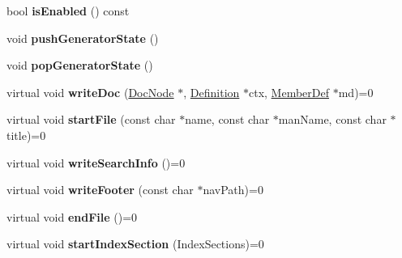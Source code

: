 \begin{DoxyCompactItemize}
\item 
\hypertarget{class_output_generator_ae2931e09e0fd8eac15c83f0254b4e4ac}{bool {\bfseries is\-Enabled} () const }\label{class_output_generator_ae2931e09e0fd8eac15c83f0254b4e4ac}

\item 
\hypertarget{class_output_generator_aff968dbb6182903ac3a2c899cf1078f3}{void {\bfseries push\-Generator\-State} ()}\label{class_output_generator_aff968dbb6182903ac3a2c899cf1078f3}

\item 
\hypertarget{class_output_generator_a9fd3c9d8d193a665b4b1c233ae573753}{void {\bfseries pop\-Generator\-State} ()}\label{class_output_generator_a9fd3c9d8d193a665b4b1c233ae573753}

\item 
\hypertarget{class_output_generator_afc7cddcd264f5a03354e49ef05784e83}{virtual void {\bfseries write\-Doc} (\hyperlink{class_doc_node}{Doc\-Node} $\ast$, \hyperlink{class_definition}{Definition} $\ast$ctx, \hyperlink{class_member_def}{Member\-Def} $\ast$md)=0}\label{class_output_generator_afc7cddcd264f5a03354e49ef05784e83}

\item 
\hypertarget{class_output_generator_ad3b720cb3c3605739030faabe156e3ff}{virtual void {\bfseries start\-File} (const char $\ast$name, const char $\ast$man\-Name, const char $\ast$title)=0}\label{class_output_generator_ad3b720cb3c3605739030faabe156e3ff}

\item 
\hypertarget{class_output_generator_aafe95bf864709d9e591b900136928aab}{virtual void {\bfseries write\-Search\-Info} ()=0}\label{class_output_generator_aafe95bf864709d9e591b900136928aab}

\item 
\hypertarget{class_output_generator_acfbf34d1085ca4a3c6fc4ce1c9be5f9d}{virtual void {\bfseries write\-Footer} (const char $\ast$nav\-Path)=0}\label{class_output_generator_acfbf34d1085ca4a3c6fc4ce1c9be5f9d}

\item 
\hypertarget{class_output_generator_af3f282b18cf0e7d60c3674337acf747a}{virtual void {\bfseries end\-File} ()=0}\label{class_output_generator_af3f282b18cf0e7d60c3674337acf747a}

\item 
\hypertarget{class_output_generator_af5c81bee72c090f72d73eb4fb470fabc}{virtual void {\bfseries start\-Index\-Section} (Index\-Sections)=0}\label{class_output_generator_af5c81bee72c090f72d73eb4fb470fabc}


\end{DoxyCompactItemize}
